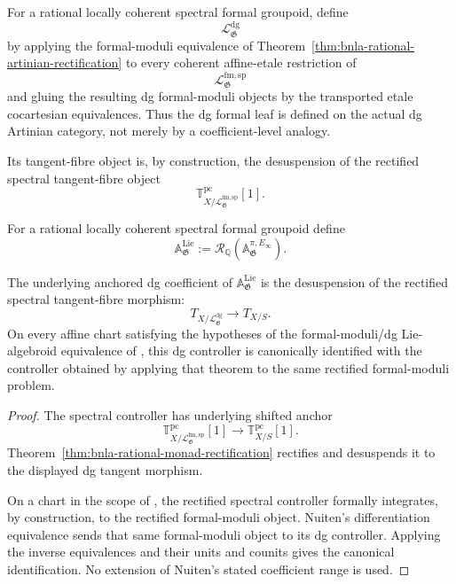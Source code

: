 \begin{definition}
\label{def:bnla-dg-formal-leaf}
For a rational locally coherent spectral formal groupoid, define
\[
    \mathcal L^{\mathrm{dg}}_{\mathfrak G}
\]
by applying the formal-moduli equivalence of
Theorem~\ref{thm:bnla-rational-artinian-rectification} to every coherent
affine-etale restriction of
\[
    \mathcal L^{\mathrm{fm,sp}}_{\mathfrak G}
\]
and gluing the resulting dg formal-moduli objects by the transported etale
cocartesian equivalences.  Thus the dg formal leaf is defined on the actual
dg Artinian category, not merely by a coefficient-level analogy.

Its tangent-fibre object is, by construction, the desuspension of the
rectified spectral tangent-fibre object
\[
    \mathbb T^{\mathrm{pc}}_{X/
      \mathcal L^{\mathrm{fm,sp}}_{\mathfrak G}}[1].
\]
\end{definition}

\begin{definition}
\label{def:bnla-dg-controller}
For a rational locally coherent spectral formal groupoid define
\[
\boxed{
    \mathbb A^{\mathrm{Lie}}_{\mathfrak G}
    :=
    \mathcal R_{\mathbb Q}
    \left(\mathbb A^{\pi,E_\infty}_{\mathfrak G}\right).}
\]
\end{definition}

\begin{theorem}
\label{thm:bnla-dg-lie-rectification}
The underlying anchored dg coefficient of
$\mathbb A^{\mathrm{Lie}}_{\mathfrak G}$ is the desuspension of the rectified
spectral tangent-fibre morphism:
\[
\boxed{
    T_{X/\mathcal L^{\mathrm{dg}}_{\mathfrak G}}
    \longrightarrow
    T_{X/S}.}
\]
On every affine chart satisfying the hypotheses of the formal-moduli/dg
Lie-algebroid equivalence of \cite{Nuiten2019}, this dg controller is
canonically identified with the controller obtained by applying that theorem
to the same rectified formal-moduli problem.
\end{theorem}

\begin{proof}
The spectral controller has underlying shifted anchor
\[
    \mathbb T^{\mathrm{pc}}_{X/
      \mathcal L^{\mathrm{fm,sp}}_{\mathfrak G}}[1]
    \longrightarrow
    \mathbb T^{\mathrm{pc}}_{X/S}[1].
\]
Theorem~\ref{thm:bnla-rational-monad-rectification} rectifies and desuspends
it to the displayed dg tangent morphism.

On a chart in the scope of \cite{Nuiten2019}, the rectified spectral
controller formally integrates, by construction, to the rectified
formal-moduli object.  Nuiten's differentiation equivalence sends that same
formal-moduli object to its dg controller.  Applying the inverse equivalences
and their units and counits gives the canonical identification.  No extension
of Nuiten's stated coefficient range is used.
\end{proof}


